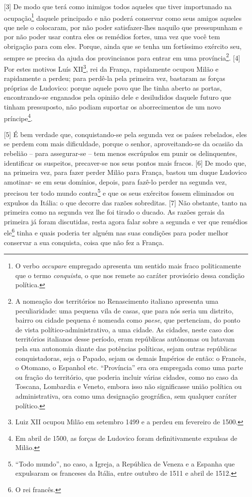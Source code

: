 {[}3{]} De modo que terá como inimigos todos aqueles que tiver
importunado na ocupação\footnote{O verbo \emph{occupare} empregado
  apresenta um sentido mais fraco politicamente que o termo
  \emph{conquista}, o que nos remete ao caráter provisório dessa
  condição política.} daquele principado e não poderá conservar como
seus amigos aqueles que nele o colocaram, por não poder satisfazer-lhes
naquilo que pressupunham e por não poder usar contra eles os remédios
fortes, uma vez que você tem obrigação para com eles. Porque, ainda que
se tenha um fortíssimo exército seu, sempre se precisa da ajuda dos
provincianos para entrar em uma província\footnote{A nomeação dos
  territórios no Renascimento italiano apresenta uma peculiaridade: uma
  pequena vila de casas, que para nós seria um distrito, bairro ou
  cidade pequena é nomeada como \emph{paese}, que pertenciam, do ponto
  de vista político-administrativo, a uma cidade. As cidades, neste caso
  dos territórios italianos desse período, eram repúblicas autônomas ou
  lutavam pela sua autonomia diante das potências políticas, sejam
  outras repúblicas conquistadoras, seja o Papado, sejam os demais
  Impérios de então: o Francês, o Otomano, o Espanhol etc. ``Província''
  era ora empregada como uma parte ou fração do território, que poderia
  incluir várias cidades, como no caso da Toscana, Lombardia e Veneto,
  embora isso não significasse união política ou administrativa, ora
  como uma designação geográfica, sem qualquer caráter político.}.
{[}4{]} Por estes motivos Luís XII\footnote{Luiz XII ocupou Milão em
  setembro 1499 e a perdeu em fevereiro de 1500.}, rei da França,
rapidamente ocupou Milão e rapidamente a perdeu; para perdê-la pela
primeira vez, bastaram as forças próprias de Ludovico: porque aquele
povo que lhe tinha aberto as portas, encontrando-se enganados pela
opinião dele e desiludidos daquele futuro que tinham pressuposto, não
podiam suportar os aborrecimentos de um novo príncipe\footnote{Em abril
  de 1500, as forças de Ludovico foram definitivamente expulsas de
  Milão.}.

{[}5{]} É bem verdade que, conquistando-se pela segunda vez os países
rebelados, eles se perdem com mais dificuldade, porque o senhor,
aproveitando-se da ocasião da rebelião -- para assegurar-se -- tem menos
escrúpulos em punir os delinquentes, identificar os suspeitos,
precaver-se nos seus pontos mais fracos. {[}6{]} De modo que, na
primeira vez, para fazer perder Milão para França, bastou um duque
Ludovico amotinar- se em seus domínios, depois, para fazê-lo perder na
segunda vez, precisou ter todo mundo contra\footnote{``Todo mundo'', no
  caso, a Igreja, a República de Veneza e a Espanha que expulsaram os
  franceses da Itália, entre outubro de 1511 e abril de 1512.} e que os
seus exércitos fossem eliminados ou expulsos da Itália: o que decorre
das razões sobreditas. {[}7{]} Não obstante, tanto na primeira como na
segunda vez lhe foi tirado o ducado. As razões gerais da primeira já
foram discutidas, resta agora falar sobre a segunda e ver que remédios
ele\footnote{O rei francês.} tinha e quais poderia ter alguém nas suas
condições para poder melhor conservar a sua conquista, coisa que não fez
a França.

